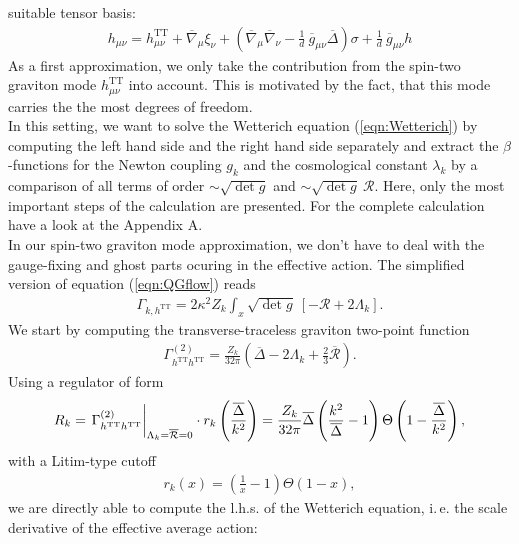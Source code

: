 suitable tensor basis:
\begin{align}
	h_{\mu\nu} = h_{\mu\nu}^{\text{TT}} + \overline{\nabla}_{\mu}\xi_{\nu} + \left(\overline{\nabla}_{\mu}\overline{\nabla}_{\nu} - \frac{1}{d} \ \overline{g}_{\mu\nu}\overline{\Delta}\right)\sigma + \frac{1}{d} \ \overline{g}_{\mu\nu}h
\end{align}
As a first approximation, we only take the contribution from the spin-two graviton mode $h_{\mu\nu}^{\text{TT}}$ into account. This is motivated by the fact, that this mode carries the the most degrees of freedom.\\ %
In this setting, we want to solve the Wetterich equation (\ref{eqn:Wetterich}) by computing the left hand side and the right hand side separately and extract the $\beta$-functions for the Newton coupling $g_k$ and the cosmological constant $\lambda_k$ by a comparison of all terms of order $\sim\sqrt{\operatorname{det}g}$ and $\sim \sqrt{\operatorname{det}g} \ \mathcal{R}$. Here, only the most important steps of the calculation are presented. For the complete calculation have a look at the Appendix A. \\%
In our spin-two graviton mode approximation, we don't have to deal with the gauge-fixing and ghost parts ocuring in the effective action. The simplified version of equation (\ref{eqn:QGflow}) reads
\begin{align}
	\Gamma_{k, h^{\text{TT}}} = 2\kappa^2Z_k \int_x \sqrt{\operatorname{det}g} \ [-\mathcal{R} + 2\Lambda_k].
\end{align}
We start by computing the transverse-traceless graviton two-point function
\begin{align}
\Gamma_{h^{\text{TT}}h^{\text{TT}}}^{(2)} = \frac{Z_k}{32\pi}\left(\overline{\Delta} - 2\Lambda_k+\frac{2}{3}\overline{\mathcal{R}}\right).
\end{align}
Using a regulator of form
\begin{align}
R_k  = \eval{\Gamma_{h^{\text{TT}}h^{\text{TT}}}^{(2)}}_{\Lambda_k=\overline{\mathcal{R}}=0} \cdot r_k\left(\frac{\overline{\Delta}}{k^2}\right) = \frac{Z_k}{32\pi}\overline{\Delta}\left(\frac{k^2}{\overline{\Delta}}-1\right)\Theta\left(1-\frac{\overline{\Delta}}{k^2}\right), \nonumber
\end{align}
with a Litim-type cutoff
\begin{align}
r_k(x) = \left(\frac{1}{x}-1\right)\Theta(1-x),
\end{align}
we are directly able to compute the l.h.s. of the Wetterich equation, i.\,e. the scale derivative of the effective average action:
